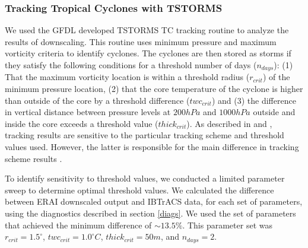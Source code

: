 \subsubsection{Tracking Tropical Cyclones with TSTORMS}
\label{tstorms}
We used the GFDL developed TSTORMS \cite{tc_algo} TC tracking routine to analyze the results of downscaling. This routine uses minimum pressure and maximum vorticity criteria to identify cyclones. The cyclones are then stored as storms if they satisfy the following conditions for a threshold number of days ($n_{days}$): (1) That the maximum vorticity location is within a threshold radius ($r_{crit}$) of the minimum pressure location, (2) that the core temperature of the cyclone is higher than outside of the core by a threshold difference ($twc_{crit}$) and (3) the difference in vertical distance between pressure levels at $200hPa$ and $1000hPa$ outside and inside the core exceeds a threshold value ($thick_{crit}$). As described in \cite{kerry_clivar} and \cite{tc_algo}, tracking results are sensitive to the particular tracking scheme and threshold values used. However, the latter is responsible for the main difference in tracking scheme results \cite{tc_track}. 
\par
To identify sensitivity to threshold values, we conducted a limited parameter sweep to determine optimal threshold values. We calculated the difference between ERAI downscaled output and IBTrACS data, for each set of parameters, using the diagnostics described in section \ref{diags}. We used the set of parameters that achieved the minimum difference of ${\sim}13.5\%$. This parameter set was $r_{crit} = 1.5^{\circ}$, $twc_{crit} = 1.0^{\circ}C$, $thick_{crit} = 50m$, and $n_{days} = 2$.  
